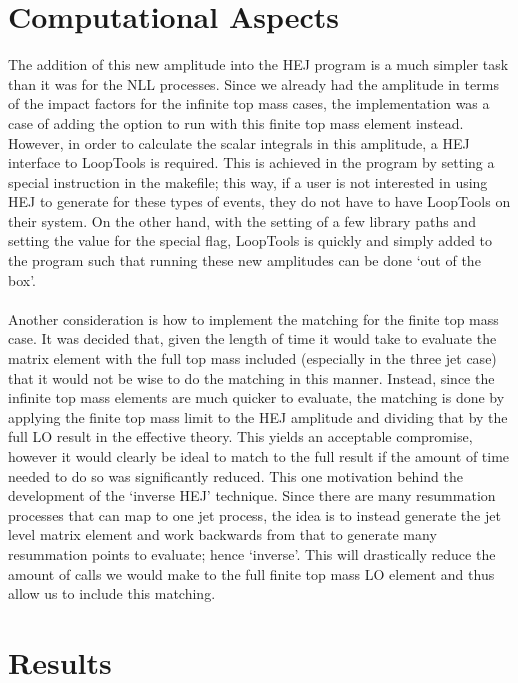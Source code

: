 \section{Computational Aspects}

The addition of this new amplitude into the HEJ program is a much simpler task than it was for the NLL processes. Since we already had the amplitude in terms of the impact factors for the infinite top mass cases, the implementation was a case of adding the option to run with this finite top mass element instead. However, in order to calculate the scalar integrals in this amplitude, a HEJ interface to LoopTools is required. This is achieved in the program by setting a special instruction in the makefile; this way, if a user is not interested in using HEJ to generate for these types of events, they do not have to have LoopTools on their system. On the other hand, with the setting of a few library paths and setting the value for the special flag, LoopTools is quickly and simply added to the program such that running these new amplitudes can be done `out of the box'. \\
\\
Another consideration is how to implement the matching for the finite top mass case. It was decided that, given the length of time it would take to evaluate the matrix element with the full top mass included (especially in the three jet case) that it would not be wise to do the matching in this manner. Instead, since the infinite top mass elements are much quicker to evaluate, the matching is done by applying the finite top mass limit to the HEJ amplitude and dividing that by the full LO result in the effective theory. This yields an acceptable compromise, however it would clearly be ideal to match to the full result if the amount of time needed to do so was significantly reduced. This one motivation behind the development of the `inverse HEJ' technique. Since there are many resummation processes that can map to one jet process, the idea is to instead generate the jet level matrix element and work backwards from that to generate many resummation points to evaluate; hence `inverse'. This will drastically reduce the amount of calls we would make to the full finite top mass LO element and thus allow us to include this matching. 

\section{Results}


